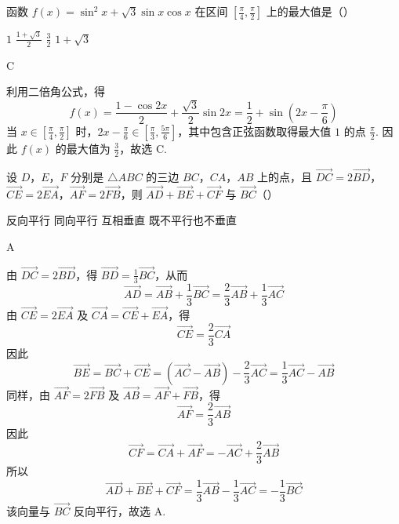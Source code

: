 \begin{problem}
函数 \( f(x) = \sin^2 x + \sqrt{3}\sin x\cos x \) 在区间 \(\left[\frac{\pi}{4},\frac{\pi}{2}\right]\) 上的最大值是（\quad）

\choices
    {\(1\)}
    {\(\frac{1 + \sqrt{3}}{2}\)}
    {\(\frac{3}{2}\)}
    {\(1 + \sqrt{3}\)}
\end{problem}

\begin{answer}
C
\end{answer}

\begin{solution}
利用二倍角公式，得
\[
f(x)=\frac{1-\cos 2x}{2}+\frac{\sqrt{3}}{2}\sin 2x
=\frac12+\sin\left(2x-\frac{\pi}{6}\right)
\]
当 \(x\in\left[\frac{\pi}{4},\frac{\pi}{2}\right]\) 时，\(2x-\frac{\pi}{6}\in\left[\frac{\pi}{3},\frac{5\pi}{6}\right]\)，其中包含正弦函数取得最大值 \(1\) 的点 \(\frac{\pi}{2}\). 因此 \(f(x)\) 的最大值为 \(\frac32\)，故选 C.
\end{solution}

\begin{problem}
设 \(D\)，\(E\)，\(F\) 分别是 \(\triangle ABC\) 的三边 \(BC\)，\(CA\)，\(AB\) 上的点，且 \(\overrightarrow{DC} = 2\overrightarrow{BD}\)，\(\overrightarrow{CE} = 2\overrightarrow{EA}\)，\(\overrightarrow{AF} = 2\overrightarrow{FB}\)，则 \(\overrightarrow{AD} + \overrightarrow{BE} + \overrightarrow{CF}\) 与 \(\overrightarrow{BC}\)（\quad）

\choices
    {反向平行}
    {同向平行}
    {互相垂直}
    {既不平行也不垂直}
\end{problem}

\begin{answer}
A
\end{answer}

\begin{solution}
由 \(\overrightarrow{DC}=2\overrightarrow{BD}\)，得 \(\overrightarrow{BD}=\frac13\overrightarrow{BC}\)，从而
\[
\overrightarrow{AD}=\overrightarrow{AB}+\frac13\overrightarrow{BC}
=\frac23\overrightarrow{AB}+\frac13\overrightarrow{AC}
\]
由 \(\overrightarrow{CE}=2\overrightarrow{EA}\) 及 \(\overrightarrow{CA}=\overrightarrow{CE}+\overrightarrow{EA}\)，得
\[
\overrightarrow{CE}=\frac23\overrightarrow{CA}
\]
因此
\[
\overrightarrow{BE}=\overrightarrow{BC}+\overrightarrow{CE}
=\left(\overrightarrow{AC}-\overrightarrow{AB}\right)-\frac23\overrightarrow{AC}
=\frac13\overrightarrow{AC}-\overrightarrow{AB}
\]
同样，由 \(\overrightarrow{AF}=2\overrightarrow{FB}\) 及 \(\overrightarrow{AB}=\overrightarrow{AF}+\overrightarrow{FB}\)，得
\[
\overrightarrow{AF}=\frac23\overrightarrow{AB}
\]
因此
\[
\overrightarrow{CF}=\overrightarrow{CA}+\overrightarrow{AF}
=-\overrightarrow{AC}+\frac23\overrightarrow{AB}
\]
所以
\[
\overrightarrow{AD}+\overrightarrow{BE}+\overrightarrow{CF}
=\frac13\overrightarrow{AB}-\frac13\overrightarrow{AC}
=-\frac13\overrightarrow{BC}
\]
该向量与 \(\overrightarrow{BC}\) 反向平行，故选 A.
\end{solution}


